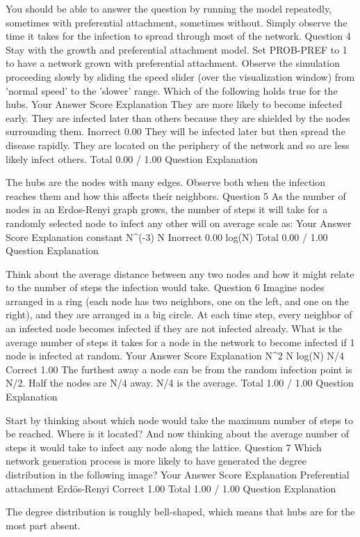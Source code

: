You should be able to answer the question by running the model repeatedly, sometimes with preferential attachment, sometimes without. Simply observe the time it takes for the infection to spread through most of the network.
Question 4
Stay with the growth and preferential attachment model. Set PROB-PREF to 1 to have a network grown with preferential attachment. Observe the simulation proceeding slowly by sliding the speed slider (over the visualization window) from 'normal speed' to the 'slower' range. Which of the following holds true for the hubs.
Your Answer		Score	Explanation
They are more likely to become infected early.			
They are infected later than others because they are shielded by the nodes surrounding them.	Inorrect	0.00	
They will be infected later but then spread the disease rapidly.			
They are located on the periphery of the network and so are less likely infect others.			
Total		0.00 / 1.00	
Question Explanation

The hubs are the nodes with many edges. Observe both when the infection reaches them and how this affects their neighbors.
Question 5
As the number of nodes in an Erdos-Renyi graph grows, the number of steps it will take for a randomly selected node to infect any other will on average scale as:
Your Answer		Score	Explanation
constant			
N^(-3)			
N	Inorrect	0.00	
log(N)			
Total		0.00 / 1.00	
Question Explanation

Think about the average distance between any two nodes and how it might relate to the number of steps the infection would take.
Question 6
Imagine nodes arranged in a ring (each node has two neighbors, one on the left, and one on the right), and they are arranged in a big circle. At each time step, every neighbor of an infected node becomes infected if they are not infected already. What is the average number of steps it takes for a node in the network to become infected if 1 node is infected at random.
Your Answer		Score	Explanation
N^2			
N			
log(N)			
N/4	Correct	1.00	The furthest away a node can be from the random infection point is N/2. Half the nodes are N/4 away. N/4 is the average.
Total		1.00 / 1.00	
Question Explanation

Start by thinking about which node would take the maximum number of steps to be reached. Where is it located? And now thinking about the average number of steps it would take to infect any node along the lattice.
Question 7
Which network generation process is more likely to have generated the degree distribution in the following image?
Your Answer		Score	Explanation
Preferential attachment			
Erdös-Renyi	Correct	1.00	
Total		1.00 / 1.00	
Question Explanation

The degree distribution is roughly bell-shaped, which means that hubs are for the most part absent.
